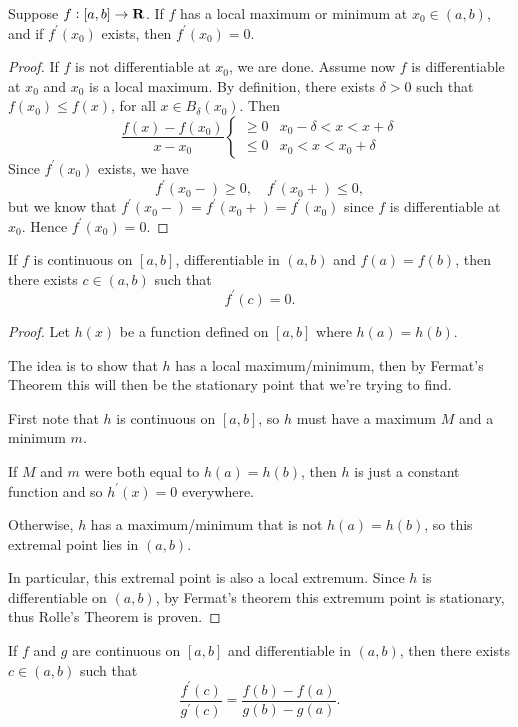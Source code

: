 \begin{lemma}
Suppose $f:[a,b]\to\mathbf R$. If $f$ has a local maximum or minimum at $x_0\in(a,b)$, and if $f^\prime(x_0)$ exists, then $f^\prime(x_0)=0$.
\end{lemma}

\begin{proof}
If $f$ is not differentiable at $x_0$, we are done. Assume now $f$ is differentiable at $x_0$ and $x_0$ is a local maximum. By definition, there exists $\delta>0$ such that $f(x_0)\le f(x)$, for all $x\in B_\delta(x_0)$. Then
\[ \frac{f(x)-f(x_0)}{x-x_0}\begin{cases}
\ge0 & x_0-\delta<x<x+\delta\\
\le0 & x_0<x<x_0+\delta
\end{cases} \]
Since $f^\prime(x_0)$ exists, we have
\[ f^\prime(x_0-)\ge0, \quad f^\prime(x_0+)\le0, \]
but we know that $f^\prime(x_0-)=f^\prime(x_0+)=f^\prime(x_0)$ since $f$ is differentiable at $x_0$. Hence $f^\prime(x_0)=0$.
\end{proof}

\begin{theorem}\label{them:rolle}
If $f$ is continuous on $[a,b]$, differentiable in $(a,b)$ and $f(a)=f(b)$, then there exists $c\in(a,b)$ such that 
\[ f^\prime(c)=0. \]
\end{theorem}

\begin{proof}
Let $h(x)$ be a function defined on $[a,b]$ where $h(a)=h(b)$.

The idea is to show that $h$ has a local maximum/minimum, then by Fermat's Theorem this will then be the stationary point that we're trying to find.

First note that $h$ is continuous on $[a,b]$, so $h$ must have a maximum $M$ and a minimum $m$.

If $M$ and $m$ were both equal to $h(a)=h(b)$, then $h$ is just a constant function and so $h^\prime(x)=0$ everywhere.

Otherwise, $h$ has a maximum/minimum that is not $h(a)=h(b)$, so this extremal point lies in $(a,b)$.

In particular, this extremal point is also a local extremum.
Since $h$ is differentiable on $(a,b)$, by Fermat's theorem this extremum point is stationary, thus Rolle's Theorem is proven.
\end{proof}

\begin{theorem}\label{thrm:generalised-mvt}
If $f$ and $g$ are continuous on $[a,b]$ and differentiable in $(a,b)$, then there exists $c\in(a,b)$ such that
\[ \frac{f^\prime(c)}{g^\prime(c)}=\frac{f(b)-f(a)}{g(b)-g(a)}. \]
\end{theorem}


